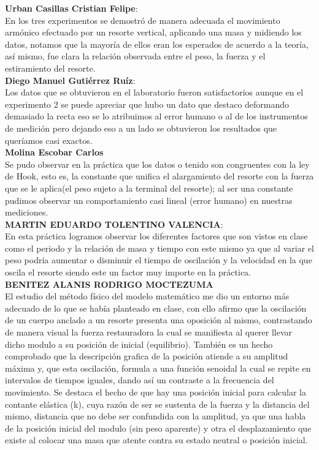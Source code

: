 \documentclass[11pt,a4paper]{article}
\begin{document}
\begin{multicols}{2}
\textbf{Urban Casillas Cristian Felipe}:\\En los tres experimentos se demostró de manera adecuada el movimiento armónico efectuado por un resorte vertical, aplicando una masa y midiendo los datos, notamos que la mayoría de ellos eran los esperados de acuerdo a la teoría, así mismo, fue clara la relación observada entre el peso, la fuerza y el estiramiento del resorte.\\
\textbf{Diego Manuel Gutiérrez Ruíz}:\\Los datos que se obtuvieron en el laboratorio fueron satisfactorios aunque en el experimento 2  se puede apreciar que hubo un dato  que destaco deformando demasiado la recta eso se lo atribuimos al error humano o al de los instrumentos de medición pero dejando eso a un lado se obtuvieron los resultados que queríamos casi exactos.\\
\textbf{Molina Escobar Carlos}\\Se pudo observar en la práctica que los datos o tenido son congruentes con la ley de Hook, esto es, la constante que unifica el alargamiento del resorte con la fuerza que se le aplica(el peso sujeto a la terminal del resorte); al ser una constante pudimos observar un comportamiento casi lineal (error humano) en nuestras mediciones.\\
\textbf{MARTIN EDUARDO TOLENTINO VALENCIA}:\\En esta práctica logramos observar los diferentes factores que son vistos en clase como el periodo y la relación de masa y tiempo con este mismo ya que al variar el peso podría aumentar o  disminuir el tiempo de oscilación  y la velocidad en la que oscila el resorte siendo este un factor muy importe en la práctica.\\
\textbf{BENITEZ ALANIS RODRIGO MOCTEZUMA}\\
El estudio del método físico del modelo matemático me dio un entorno más adecuado de lo que se había planteado en clase, con ello afirmo que la oscilación de un cuerpo anclado a un resorte presenta una oposición al mismo, contrastando de manera visual la fuerza restauradora la cual se manifiesta al querer llevar dicho modulo a su posición de inicial (equilibrio). También es un hecho comprobado que la descripción grafica de la posición atiende a su amplitud máxima y, que esta oscilación, formula a una función senoidal la cual se repite en intervalos de tiempos iguales, dando así un contraste a la frecuencia del movimiento.
Se destaca el hecho de que hay una posición inicial para calcular la contante elástica (k), cuya razón de ser se sustenta de la fuerza y la distancia del mismo, distancia que no debe ser confundida con la amplitud, ya que una habla de la posición inicial del modulo (sin peso aparente) y otra el desplazamiento que existe al colocar una masa que atente contra su estado neutral o posición inicial.

\end{multicols}
\end{document}
